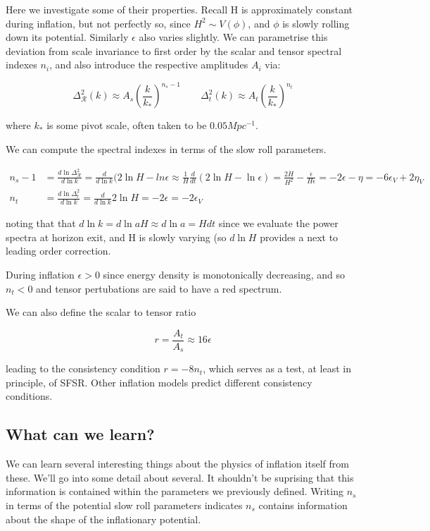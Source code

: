\documentclass[a4paper,11pt]{article}
\begin{document}
Here we investigate some of their properties. Recall H is approximately constant during inflation, but not perfectly so, since $H^2 \sim V(\phi)$, and $\phi$ is slowly rolling down its potential. Similarly $\epsilon$ also varies slightly. We can parametrise this deviation from scale invariance to first order by the scalar and tensor spectral indexes $n_i$, and also introduce the respective amplitudes $A_i$ via:

\begin{equation}
\Delta^2_{\mathcal{R}}(k) \approx A_s(\frac{k}{k_*})^{n_s-1} \qquad
\Delta^2_t(k) \approx A_t(\frac{k}{k_*})^{n_t}
\end{equation}

where $k_*$ is some pivot scale, often taken to be $0.05Mpc^{-1}$.

We can compute the spectral indexes in terms of the slow roll parameters. 

\begin{align}
n_s-1 &= \frac{d\ln{\Delta^2_{\mathcal{R}}}}{d\ln{k}} = \frac{d}{d\ln{k}}(2\ln{H}-ln{\epsilon} \approx \frac{1}{H}\frac{d}{dt}(2\ln{H}-\ln{\epsilon}) = \frac{2\dot{H}}{H^2}-\frac{\dot{\epsilon}}{H\epsilon} = -2\epsilon-\eta = -6\epsilon_V+2\eta_V\\
n_t &= \frac{d\ln{\Delta^2_t}}{d\ln{k}} = \frac{d}{d\ln{k}}2\ln{H}=-2\epsilon=-2\epsilon_V
\end{align}

noting that that $d\ln{k} = d\ln{aH} \approx d\ln{a} = Hdt$ since we evaluate the power spectra 
at horizon exit, and H is slowly varying (so $d\ln{H}$ provides a next to leading order correction.


During inflation $\epsilon>0$ since energy density is monotonically decreasing, and so $n_t<0$ and tensor pertubations are said to have a red spectrum.

We can also define the scalar to tensor ratio 

\begin{equation}
r=\frac{A_t}{A_s} \approx 16\epsilon
\end{equation}

leading to the consistency condition $r=-8n_t$, which serves as a test, at least in principle, of SFSR. Other inflation models predict different consistency conditions.


\subsection{What can we learn?}
We can learn several interesting things about the physics of inflation itself from these. We'll go into some detail about several. It shouldn't be suprising that this information is contained within the parameters we previously defined. Writing $n_s$ in terms of the potential slow roll parameters indicates $n_s$ contains information about the shape of the inflationary potential.\\ 
\end{document}
